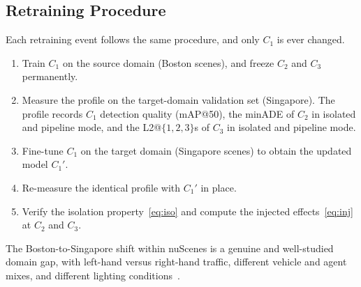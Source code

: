 \documentclass[conference]{IEEEtran}
\begin{document}
\subsection{Retraining Procedure}
\label{sec:experiment}
Each retraining event follows the same procedure, and only $C_1$ is ever changed.
\begin{enumerate}
\item Train $C_1$ on the source domain (Boston scenes), and freeze $C_2$ and $C_3$
permanently.
\item Measure the profile on the target-domain validation set (Singapore). The
profile records $C_1$ detection quality (mAP@50), the minADE of $C_2$ in isolated
and pipeline mode, and the L2@$\{1,2,3\}$s of $C_3$ in isolated and pipeline mode.
\item Fine-tune $C_1$ on the target domain (Singapore scenes) to obtain the
updated model $C_1'$.
\item Re-measure the identical profile with $C_1'$ in place.
\item Verify the isolation property~\eqref{eq:iso} and compute the injected
effects~\eqref{eq:inj} at $C_2$ and $C_3$.
\end{enumerate}
The Boston-to-Singapore shift within nuScenes is a genuine and well-studied domain
gap, with left-hand versus right-hand traffic, different vehicle and agent mixes,
and different lighting conditions~\cite{caesar2020nuscenes}.
\end{document}
